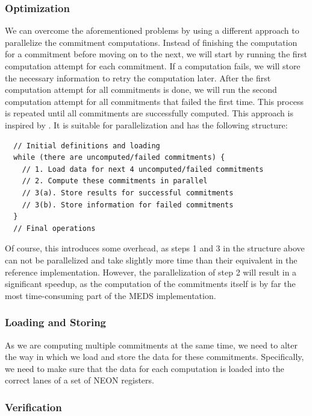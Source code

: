 \documentclass[11pt,a4paper]{report}
\theoremstyle{definition}
\begin{document}
\subsubsection{Optimization}
\label{sec:commitmentparallelizationoptimization}
We can overcome the aforementioned problems by using a different approach to parallelize the commitment computations. Instead of finishing the computation for a commitment before moving on to the next, we will start by running the first computation attempt for each commitment. If a computation fails, we will store the necessary information to retry the computation later. After the first computation attempt for all commitments is done, we will run the second computation attempt for all commitments that failed the first time. This process is repeated until all commitments are successfully computed. This approach is inspired by \cite{IIS2023HighLevel}. It is suitable for parallelization and has the following structure:
\begin{verbatim}
  // Initial definitions and loading
  while (there are uncomputed/failed commitments) {
    // 1. Load data for next 4 uncomputed/failed commitments
    // 2. Compute these commitments in parallel
    // 3(a). Store results for successful commitments
    // 3(b). Store information for failed commitments
  }
  // Final operations
\end{verbatim}
Of course, this introduces some overhead, as steps 1 and 3 in the structure above can not be parallelized and take slightly more time than their equivalent in the reference implementation. However, the parallelization of step 2 will result in a significant speedup, as the computation of the commitments itself is by far the most time-consuming part of the MEDS implementation.

\subsubsection{Loading and Storing}
\label{sec:commitmentparallelizationloadingstoring}
As we are computing multiple commitments at the same time, we need to alter the way in which we load and store the data for these commitments. Specifically, we need to make sure that the data for each computation is loaded into the correct lanes of a set of NEON registers.

\subsubsection{Verification}
\end{document}
